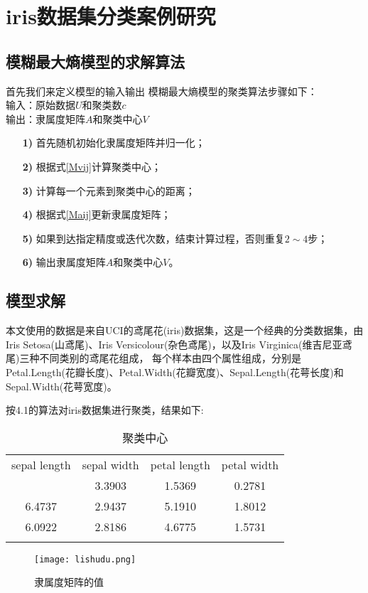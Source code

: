 \chapter{iris数据集分类案例研究}
\section{模糊最大熵模型的求解算法}
首先我们来定义模型的输入输出
模糊最大熵模型的聚类算法步骤如下：\\
输入：原始数据$U$和聚类数$c$\\
输出：隶属度矩阵$A$和聚类中心$V$
\begin{itemize}
    \item[\bf{1)}]首先随机初始化隶属度矩阵并归一化；
    \item[\bf{2)}]根据式\ref{Mvij}计算聚类中心；
    \item[\bf{3)}]计算每一个元素到聚类中心的距离；
    \item[\bf{4)}]根据式\ref{Maij}更新隶属度矩阵；
    \item[\bf{5)}]如果到达指定精度或迭代次数，结束计算过程，否则重复$2\sim 4$步；
    \item[\bf{6)}]输出隶属度矩阵$A$和聚类中心$V$。
\end{itemize}

\section{模型求解}
\par
本文使用的数据是来自UCI的鸢尾花(iris)数据集，这是一个经典的分类数据集，由Iris Setosa(山鸢尾)、Iris Versicolour(杂色鸢尾)，以及Iris Virginica(维吉尼亚鸢尾)三种不同类别的鸢尾花组成，
每个样本由四个属性组成，分别是Petal.Length(花瓣长度)、Petal.Width(花瓣宽度)、Sepal.Length(花萼长度)和Sepal.Width(花萼宽度)。
\par 按4.1的算法对iris数据集进行聚类，结果如下:
\begin{table}[!ht]
    \label{聚类中心}
    \caption{聚类中心}
    \centering
    \begin{tabular}{c c c c}
        \whline sepal length & sepal width & petal length & petal width \\\whline
        5.0136               & 3.3903      & 1.5369       & 0.2781      \\
        6.4737               & 2.9437      & 5.1910       & 1.8012      \\
        6.0922               & 2.8186      & 4.6775       & 1.5731      \\
        \whline
    \end{tabular}
\end{table}
\begin{figure}[!ht]
    \centering
    \texttt{[image: lishudu.png]}
    \caption{隶属度矩阵的值}
    \label{隶属度}
\end{figure}
